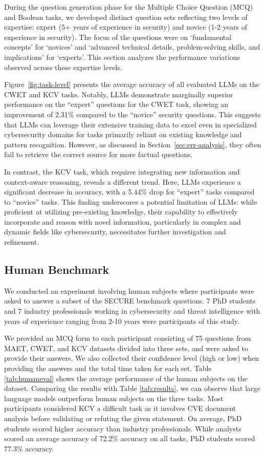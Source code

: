 \documentclass[conference]{IEEEtran}
\begin{document}
During the question generation phase for the Multiple Choice Question (MCQ) and Boolean tasks, we developed distinct question sets reflecting two levels of expertise: expert (5+ years of experience in security) and novice (1-2 years of experience in security). The focus of the questions were on `fundamental concepts' for `novices' and `advanced technical details, problem-solving skills, and implications' for `experts'. This section analyzes the performance variations observed across these expertise levels.



Figure~\ref{fig:task-level} presents the average accuracy of all evaluated LLMs on the CWET and KCV tasks. Notably, LLMs demonstrate marginally superior performance on the ``expert'' questions for the CWET task, showing an improvement of 2.31\% compared to the ``novice'' security questions. This suggests that LLMs can leverage their extensive training data to excel even in specialized cybersecurity domains for tasks primarily reliant on existing knowledge and pattern recognition. However, as discussed in Section~\ref{sec:err-analysis}, they often fail to retrieve the correct source for more factual questions.



In contrast, the KCV task, which requires integrating new information and context-aware reasoning, reveals a different trend. Here, LLMs experience a significant decrease in accuracy, with a 5.44\% drop for ``expert'' tasks compared to ``novice'' tasks. This finding underscores a potential limitation of LLMs: while proficient at utilizing pre-existing knowledge, their capability to effectively incorporate and reason with novel information, particularly in complex and dynamic fields like cybersecurity, necessitates further investigation and refinement.

\subsection{Human Benchmark}
We conducted an experiment involving human subjects where participants were asked to answer a subset of the SECURE benchmark questions. 7 PhD students and 7 industry professionals working in cybersecurity and threat intelligence with years of experience ranging from 2-10 years were participants of this study.

We provided an MCQ form to each participant consisting of 75 questions from MAET, CWET, and KCV datasets divided into three sets, and were asked to provide their answers. We also collected their confidence level (high or low) when providing the answers and the total time taken for each set. Table \ref{tab:humaneval} shows the average performance of the human subjects on the dataset. Comparing the results with Table \ref{tab:results}, we can observe that large language models outperform human subjects on the three tasks. Most participants considered KCV a difficult task as it involves CVE document analysis before validating or refuting the given statement. On average, PhD students scored higher accuracy than industry professionals. While analysts scored an average accuracy of 72.2\% accuracy on all tasks, PhD students scored 77.3\% accuracy. 
\end{document}
